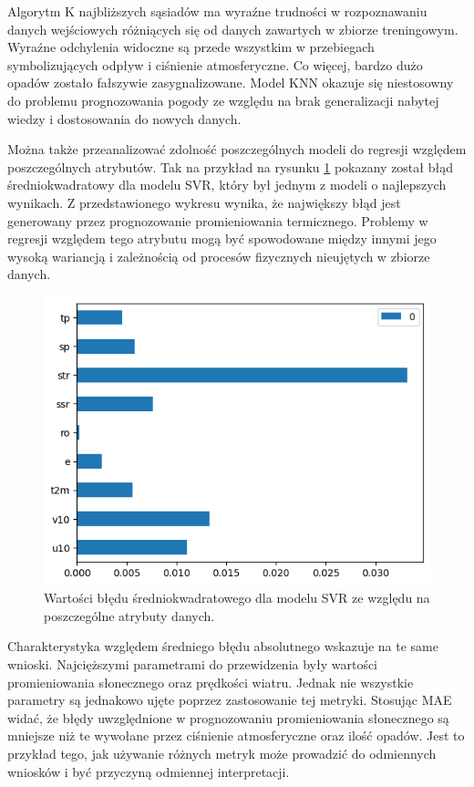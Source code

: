 Algorytm K najbliższych sąsiadów ma wyraźne trudności w rozpoznawaniu danych wejściowych różniących się od 
danych zawartych w zbiorze treningowym. Wyraźne odchylenia widoczne są przede wszystkim w przebiegach  
symbolizujących odpływ i ciśnienie atmosferyczne. Co więcej, bardzo dużo opadów zostało fałszywie
zasygnalizowane. Model KNN okazuje się niestosowny do problemu prognozowania pogody ze względu
na brak generalizacji nabytej wiedzy i dostosowania do nowych danych.

\pagebreak

Można także przeanalizować zdolność poszczególnych modeli do regresji względem poszczególnych atrybutów.
Tak na przykład na rysunku \ref{svr-mse-bar} pokazany został błąd średniokwadratowy dla modelu SVR, który był
jednym z modeli o najlepszych wynikach. Z przedstawionego wykresu wynika, że największy błąd jest generowany
przez prognozowanie promieniowania termicznego. Problemy w regresji względem tego atrybutu mogą być  
spowodowane między innymi jego wysoką wariancją i zależnością od procesów fizycznych nieujętych w zbiorze 
danych.

\begin{figure}[H]
    \centering
    \includegraphics[width=\textwidth]{images/svr_mse_bar.png}
    \caption{Wartości błędu średniokwadratowego dla modelu SVR ze względu na poszczególne atrybuty danych.}
    \label{svr-mse-bar}
\end{figure}

Charakterystyka względem średniego błędu absolutnego wskazuje na te same wnioski. Najcięższymi parametrami
do przewidzenia były wartości promieniowania słonecznego oraz prędkości wiatru. Jednak nie wszystkie
parametry są jednakowo ujęte poprzez zastosowanie tej metryki. Stosując MAE widać, że błędy 
uwzględnione w prognozowaniu promieniowania słonecznego są mniejsze niż te wywołane przez ciśnienie
atmosferyczne oraz ilość opadów. Jest to przykład tego, jak używanie różnych metryk może prowadzić do 
odmiennych wniosków i być przyczyną odmiennej interpretacji.

